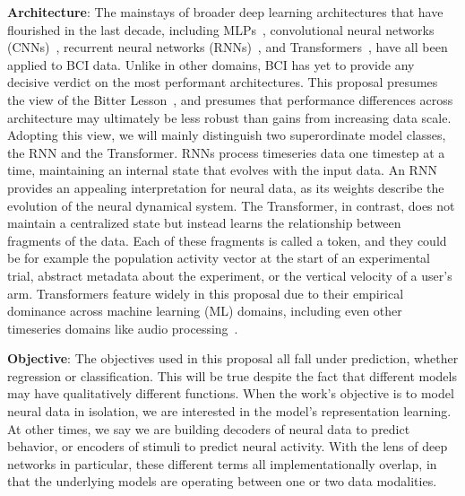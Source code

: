 \documentclass[12pt,oneside]{report}
\begin{document}
\textbf{Architecture}: The mainstays of broader deep learning architectures that have flourished in the last decade, including MLPs~\citep{Willsey2022HighVelocity}, convolutional neural networks (CNNs)~\citep{temmar2024artificial}, recurrent neural networks (RNNs)~\citep{pandarinath_18_lfads}, and Transformers~\citep{ye_21_ndt}, have all been applied to BCI data. Unlike in other domains, BCI has yet to provide any decisive verdict on the most performant architectures. This proposal presumes the view of the Bitter Lesson~\citep{sutton2019}, and presumes that performance differences across architecture may ultimately be less robust than gains from increasing data scale. Adopting this view, we will mainly distinguish two superordinate model classes, the RNN and the Transformer. RNNs process timeseries data one timestep at a time, maintaining an internal state that evolves with the input data. An RNN provides an appealing interpretation for neural data, as its weights describe the evolution of the neural dynamical system. The Transformer, in contrast, does not maintain a centralized state but instead learns the relationship between fragments of the data. Each of these fragments is called a token, and they could be for example the population activity vector at the start of an experimental trial, abstract metadata about the experiment, or the vertical velocity of a user’s arm. Transformers feature widely in this proposal due to their empirical dominance across machine learning (ML) domains, including even other timeseries domains like audio processing~\citep{radford2022whisper}.

\textbf{Objective}: The objectives used in this proposal all fall under prediction, whether regression or classification. This will be true despite the fact that different models may have qualitatively different functions. When the work’s objective is to model neural data in isolation, we are interested in the model’s representation learning. At other times, we say we are building decoders of neural data to predict behavior, or encoders of stimuli to predict neural activity. With the lens of deep networks in particular, these different terms all implementationally overlap, in that the underlying models are operating between one or two data modalities.
\end{document}
